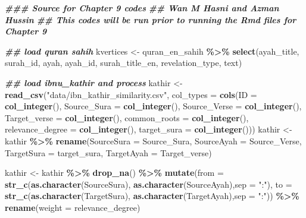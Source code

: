 \documentclass[
]{article}
\newenvironment{Shaded}{\begin{snugshade}}{\end{snugshade}}
\newcommand{\AttributeTok}[1]{\textcolor[rgb]{0.13,0.29,0.53}{#1}}
\newcommand{\DocumentationTok}[1]{\textcolor[rgb]{0.56,0.35,0.01}{\textbf{\textit{#1}}}}
\newcommand{\FunctionTok}[1]{\textcolor[rgb]{0.13,0.29,0.53}{\textbf{#1}}}
\newcommand{\NormalTok}[1]{#1}
\newcommand{\OtherTok}[1]{\textcolor[rgb]{0.56,0.35,0.01}{#1}}
\newcommand{\SpecialCharTok}[1]{\textcolor[rgb]{0.81,0.36,0.00}{\textbf{#1}}}
\newcommand{\StringTok}[1]{\textcolor[rgb]{0.31,0.60,0.02}{#1}}
\begin{document}
\begin{Shaded}
\begin{Highlighting}[]
\DocumentationTok{\#\#\# Source for Chapter 9 codes}
\DocumentationTok{\#\# Wan M Hasni and Azman Hussin}
\DocumentationTok{\#\# This codes will be run prior to running the Rmd files for Chapter 9}

\DocumentationTok{\#\# load quran sahih }
\NormalTok{kvertices }\OtherTok{\textless{}{-}}\NormalTok{ quran\_en\_sahih }\SpecialCharTok{\%\textgreater{}\%} 
  \FunctionTok{select}\NormalTok{(ayah\_title, surah\_id, ayah, ayah\_id,}
\NormalTok{         surah\_title\_en, revelation\_type, text)}

\DocumentationTok{\#\# load ibnu\_kathir and process}
\NormalTok{kathir }\OtherTok{\textless{}{-}} \FunctionTok{read\_csv}\NormalTok{(}\StringTok{"data/ibn\_kathir\_similarity.csv"}\NormalTok{, }
                   \AttributeTok{col\_types =} \FunctionTok{cols}\NormalTok{(}\AttributeTok{ID =} \FunctionTok{col\_integer}\NormalTok{(), }
                                    \AttributeTok{Source\_Sura =} \FunctionTok{col\_integer}\NormalTok{(), }
                                    \AttributeTok{Source\_Verse =} \FunctionTok{col\_integer}\NormalTok{(), }
                                    \AttributeTok{Target\_verse =} \FunctionTok{col\_integer}\NormalTok{(), }
                                    \AttributeTok{common\_roots =} \FunctionTok{col\_integer}\NormalTok{(), }
                                    \AttributeTok{relevance\_degree =} \FunctionTok{col\_integer}\NormalTok{(), }
                                    \AttributeTok{target\_sura =} \FunctionTok{col\_integer}\NormalTok{()))}
\NormalTok{kathir }\OtherTok{\textless{}{-}}\NormalTok{ kathir }\SpecialCharTok{\%\textgreater{}\%} 
  \FunctionTok{rename}\NormalTok{(}\AttributeTok{SourceSura =}\NormalTok{ Source\_Sura, }\AttributeTok{SourceAyah =}\NormalTok{ Source\_Verse,}
         \AttributeTok{TargetSura =}\NormalTok{ target\_sura, }\AttributeTok{TargetAyah =}\NormalTok{ Target\_verse)}

\NormalTok{kathir }\OtherTok{\textless{}{-}}\NormalTok{ kathir }\SpecialCharTok{\%\textgreater{}\%} 
  \FunctionTok{drop\_na}\NormalTok{() }\SpecialCharTok{\%\textgreater{}\%}  
  \FunctionTok{mutate}\NormalTok{(}\AttributeTok{from =} \FunctionTok{str\_c}\NormalTok{(}\FunctionTok{as.character}\NormalTok{(SourceSura),}
                      \FunctionTok{as.character}\NormalTok{(SourceAyah),}\AttributeTok{sep =} \StringTok{":"}\NormalTok{),}
         \AttributeTok{to =} \FunctionTok{str\_c}\NormalTok{(}\FunctionTok{as.character}\NormalTok{(TargetSura),}
                    \FunctionTok{as.character}\NormalTok{(TargetAyah),}\AttributeTok{sep =} \StringTok{":"}\NormalTok{)) }\SpecialCharTok{\%\textgreater{}\%}
  \FunctionTok{rename}\NormalTok{(}\AttributeTok{weight =}\NormalTok{ relevance\_degree)}


\end{Highlighting}
\end{Shaded}
\end{document}
